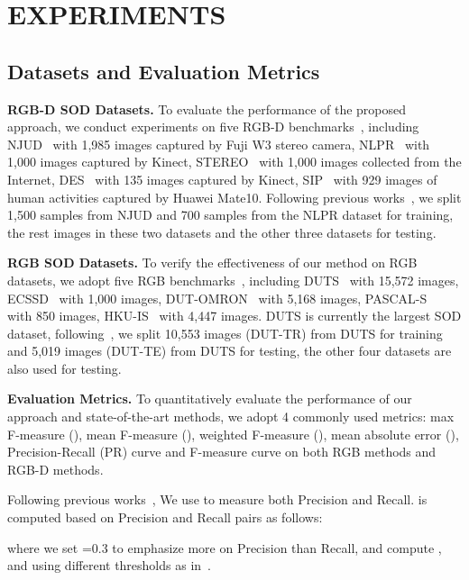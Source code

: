 \documentclass[journal]{IEEEtran}
\begin{document}
\section{EXPERIMENTS}\label{sec:experiment}

\subsection{Datasets and Evaluation Metrics}
\textbf{RGB-D SOD Datasets.} To evaluate the performance of the proposed approach, we conduct experiments on five RGB-D benchmarks~\cite{ju2014depth,peng2014rgbd,niu2012leveraging,cheng2014depth,zhu2017three}, including NJUD~\cite{ju2014depth} with 1,985 images captured by Fuji W3 stereo camera, NLPR~\cite{peng2014rgbd} with 1,000 images captured by Kinect, STEREO~\cite{niu2012leveraging} with 1,000 images collected from the Internet,  DES~\cite{cheng2014depth} with 135 images captured by Kinect, SIP~\cite{fan2019D3Net} with 929 images of human activities captured by Huawei Mate10. Following previous works~\cite{zhao2019contrast,piao2019depth}, we split 1,500 samples from NJUD and 700 samples from the NLPR dataset for training, the rest images in these two datasets and the other three datasets for testing.

\textbf{RGB SOD Datasets.} To verify the effectiveness of our method on RGB datasets, we adopt five RGB benchmarks~\cite{wang2017learning,yang2013saliency,yan2013hierarchical,li2014secrets,li2015visual}, including DUTS~\cite{wang2017learning} with 15,572 images, ECSSD~\cite{yan2013hierarchical} with 1,000 images, DUT-OMRON~\cite{yang2013saliency} with 5,168 images, PASCAL-S~\cite{li2014secrets} with 850 images, HKU-IS~\cite{li2015visual} with 4,447 images. DUTS is currently the largest SOD dataset, following~\cite{wang2017learning}, we split 10,553 images (DUT-TR) from DUTS for training and 5,019 images (DUT-TE) from DUTS for testing, the other four datasets are also used for testing.

\textbf{Evaluation Metrics.} To quantitatively evaluate the performance of our approach and state-of-the-art methods, we adopt 4 commonly used metrics: max F-measure (), mean F-measure (), weighted F-measure (), mean absolute error (), Precision-Recall (PR) curve and F-measure curve on both RGB methods and RGB-D methods.

Following previous works~\cite{oursMM}, We use  to measure both Precision and Recall.  is computed based on Precision and Recall pairs as follows:
 
 where we set =0.3 to emphasize more on Precision than Recall, and compute ,  and  using different thresholds as in~\cite{borji2015salient}.
\end{document}
